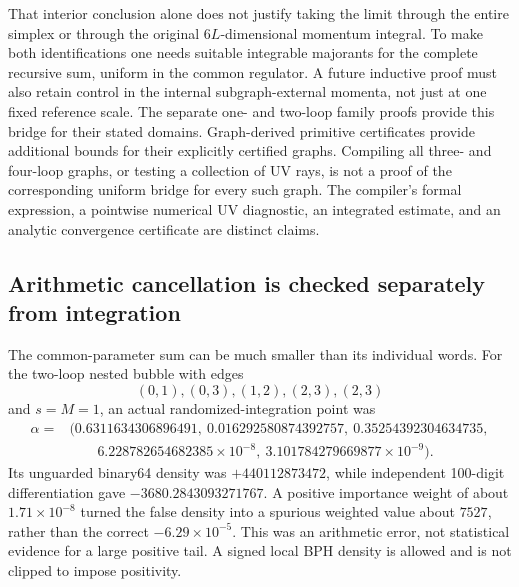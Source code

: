 That interior conclusion alone does not justify taking the limit
through the entire simplex or through the original $6L$-dimensional
momentum integral.  To make both identifications one needs suitable
integrable majorants for the complete recursive sum, uniform in the
common regulator.  A future inductive proof must also retain control in
the internal subgraph-external momenta, not just at one fixed reference
scale.  The separate one- and two-loop family proofs provide this
bridge for their stated domains.  Graph-derived primitive certificates
provide additional bounds for their explicitly certified graphs.
Compiling all three- and four-loop
graphs, or testing a collection of UV rays, is not a proof of the
corresponding uniform bridge for every such graph.  The compiler's
formal expression, a pointwise numerical UV diagnostic, an integrated
estimate, and an analytic convergence certificate are distinct claims.

\subsection{Arithmetic cancellation is checked separately from integration}

The common-parameter sum can be much smaller than its individual words.
For the two-loop nested bubble with edges
\[
 (0,1),(0,3),(1,2),(2,3),(2,3)
\]
and $s=M=1$, an actual randomized-integration point was
\[
 \begin{aligned}
 \alpha={}&(0.6311634306896491,\ 0.016292580874392757,\ 0.35254392304634735,\\
 &\qquad6.228782654682385\!\times10^{-8},\
 3.101784279669877\!\times10^{-9}).
 \end{aligned}
\]
Its unguarded binary64 density was $+440112873472$, while independent
100-digit differentiation gave $-3680.2843093271767$.  A positive
importance weight of about $1.71\times10^{-8}$ turned the false density
into a spurious weighted value about $7527$, rather than the correct
$-6.29\times10^{-5}$.  This was an arithmetic error, not statistical
evidence for a large positive tail.  A signed local BPH density is allowed
and is not clipped to impose positivity.

